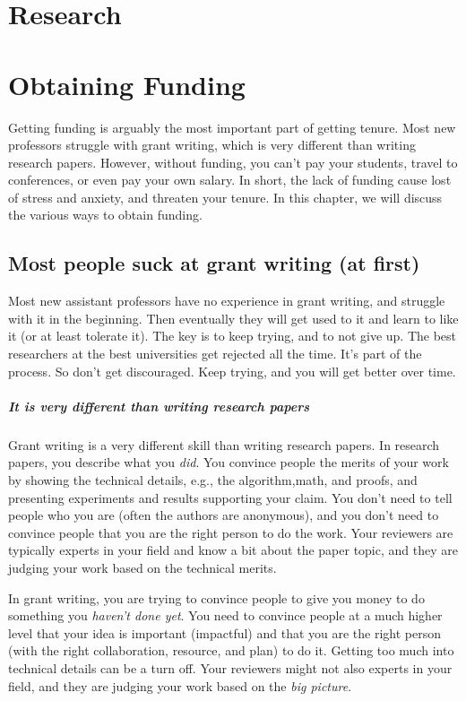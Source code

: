 \documentclass[oneside,11pt,dvipsnames]{book}
\begin{document}
\chapter{Research}
\chapter{Obtaining Funding}
Getting funding is arguably the most important part of getting tenure.  Most new professors struggle with grant writing, which is very different than writing research papers. However, without funding, you can't pay your students, travel to conferences, or even pay your own salary. In short, the lack of funding cause lost of stress and anxiety, and threaten your tenure.  In this chapter, we will discuss the various ways to obtain funding.


\section{Most people suck at grant writing (at first)} Most new assistant professors have no experience in grant writing, and struggle with it in the beginning.  Then eventually they will get used to it and learn to like it (or at least tolerate it).  The key is to keep trying, and to not give up. The best researchers at the best universities get rejected all the time.  It's part of the process.  So don't get discouraged.  Keep trying, and you will get better over time.

\paragraph{It is very different than writing research papers} Grant writing is a very different skill than writing research papers.  In research papers, you describe what you \emph{did}. You convince people the merits of your work by showing the technical details, e.g., the algorithm,math, and proofs, and presenting experiments and results supporting your claim. You don't need to tell people who you are (often the authors are anonymous), and you don't need to convince people that you are the right person to do the work.  Your reviewers are typically experts in your field and know a bit about the paper topic, and they are judging your work based on the technical merits.

In grant writing, you are trying to convince people to give you money to do something you \emph{haven't done yet}.  You need to convince people at a much higher level that your idea is important (impactful) and that you are the right person (with the right collaboration, resource, and plan) to do it. Getting too much into technical details can be a turn off.  Your reviewers might not also experts in your field, and they are judging your work based on the \emph{big picture}. 
\end{document}
